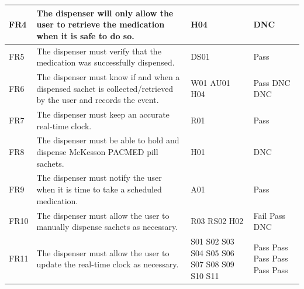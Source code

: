 \documentclass[12pt]{article}
\begin{document}
\begin{longtable}{|p{}|p{}|p{}|p{}|}
FR4    & The dispenser will only allow the user to retrieve the medication when it is safe to do so. 
&  H04  &  DNC \\ \hline
FR5 & The dispenser must verify that the medication was successfully dispensed. 
& DS01 & Pass    \\ \hline
FR6    & The dispenser must know if and when a dispensed sachet is collected/retrieved by the user and records the event. 
& W01 \newline 
AU01 \newline
H04
& Pass \newline
DNC\newline
DNC \\ \hline
FR7    & The dispenser must keep an accurate real-time clock. 
& R01 & Pass      \\ \hline
FR8    & The dispenser must be able to hold and dispense McKesson PACMED pill sachets. 
& H01 & DNC \\ \hline
FR9    & The dispenser must notify the user when it is time to take a scheduled medication. 
& A01 & Pass \\ \hline
FR10   & The dispenser must allow the user to manually dispense sachets as necessary. 
& R03 \newline
RS02
H02
& Fail \newline
Pass \newline
DNC \\ \hline
FR11   & The dispenser must allow the user to update the real-time clock as necessary. 
& S01 \newline 
S02 \newline
S03 \newline
S04 \newline
S05 \newline
S06 \newline
S07 \newline
S08 \newline
S09 \newline
S10 \newline
S11 \newline
& Pass \newline
Pass \newline
Pass \newline 
Pass \newline 
Pass \newline 
Pass \newline 

\end{longtable}
\end{document}
